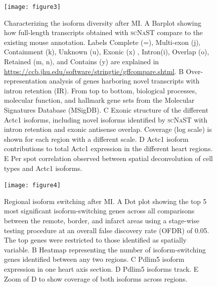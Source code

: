 \documentclass[utf8]{FrontiersinHarvard} %
\newcommand{\scnast}{\textsc{scNaST}\xspace}
\begin{document}
\begin{figure}[h!]
\begin{center}
\texttt{[image: figure3]}
\end{center}
\caption{Characterizing the isoform diversity after MI. A Barplot showing how full-length transcripts obtained with \scnast compare to the existing mouse annotation. Labels Complete (=), Multi-exon (j), Containment (k), Unknown (u), Exonic (x) , Intron(i), Overlap (o), Retained (m, n), and Contains (y) are explained in \url{https://ccb.jhu.edu/software/stringtie/gffcompare.shtml}. B Over-representation analysis of genes harboring novel transcripts with intron retention (IR). From top to bottom, biological processes, molecular function, and hallmark gene sets from the Molecular Signatures Database (MSigDB). C Exonic structure of the different Actc1 isoforms, including novel isoforms identified by \scnast with intron retention and exonic antisense overlap. Coverage (log scale) is shown for each region with a different scale. D Actc1 isoform contributions to total Actc1 expression in the different heart regions. E Per spot correlation observed between spatial deconvolution of cell types and Actc1 isoforms. }\label{fig:3}
\end{figure}


\begin{figure}[h!]
\begin{center}
\texttt{[image: figure4]}
\end{center}
\caption{Regional isoform switching after MI. A Dot plot showing the top 5 most significant isoform-switching genes across all comparisons between the remote, border, and infarct areas using a stage-wise testing procedure at an overall false discovery rate (OFDR) of 0.05. The top genes were restricted to those identified as spatially variable. B Heatmap representing the number of isoform-switching genes identified between any two regions. C Pdlim5 isoform expression in one heart axis section. D Pdlim5 isoforms track. E Zoom of D to show coverage of both isoforms across regions.}\label{fig:4}
\end{figure}
\end{document}
